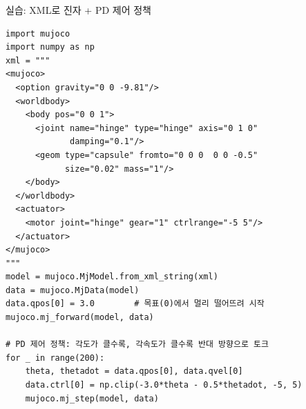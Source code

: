 \documentclass[aspectratio=169,11pt]{beamer}
\begin{document}

\begin{frame}[fragile]{실습: XML로 진자 + PD 제어 정책}
\begin{lstlisting}
import mujoco
import numpy as np
xml = """
<mujoco>
  <option gravity="0 0 -9.81"/>
  <worldbody>
    <body pos="0 0 1">
      <joint name="hinge" type="hinge" axis="0 1 0"
             damping="0.1"/>
      <geom type="capsule" fromto="0 0 0  0 0 -0.5"
            size="0.02" mass="1"/>
    </body>
  </worldbody>
  <actuator>
    <motor joint="hinge" gear="1" ctrlrange="-5 5"/>
  </actuator>
</mujoco>
"""
model = mujoco.MjModel.from_xml_string(xml)
data = mujoco.MjData(model)
data.qpos[0] = 3.0        # 목표(0)에서 멀리 떨어뜨려 시작
mujoco.mj_forward(model, data)

# PD 제어 정책: 각도가 클수록, 각속도가 클수록 반대 방향으로 토크
for _ in range(200):
    theta, thetadot = data.qpos[0], data.qvel[0]
    data.ctrl[0] = np.clip(-3.0*theta - 0.5*thetadot, -5, 5)
    mujoco.mj_step(model, data)
\end{lstlisting}
\end{frame}
\end{document}
